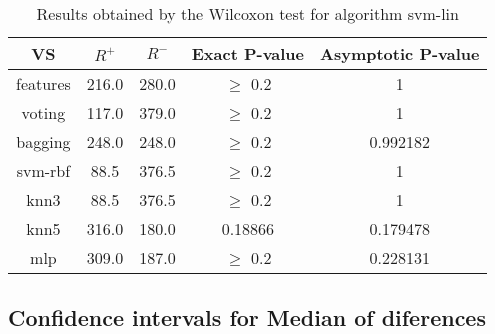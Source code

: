 \documentclass[a4paper,10pt]{article}
\begin{document}
\begin{table}[!htp]
\centering\small
\begin{tabular}{
|c|c|c|c|c|}
\hline
 VS & $R^{+}$ & $R^{-}$ & Exact P-value & Asymptotic P-value \\ \hline 
features & 216.0 & 280.0 & $\geq$ 0.2 & 1\\ \hline 
voting & 117.0 & 379.0 & $\geq$ 0.2 & 1\\ \hline 
bagging & 248.0 & 248.0 & $\geq$ 0.2 & 0.992182\\ \hline 
svm-rbf & 88.5 & 376.5 & $\geq$ 0.2 & 1\\ \hline 
knn3 & 88.5 & 376.5 & $\geq$ 0.2 & 1\\ \hline 
knn5 & 316.0 & 180.0 & 0.18866 & 0.179478\\ \hline 
mlp & 309.0 & 187.0 & $\geq$ 0.2 & 0.228131\\ \hline 

\end{tabular}
\caption{Results obtained by the Wilcoxon test for algorithm svm-lin}
\end{table}

\subsection{Confidence intervals for Median of diferences}
\end{document}
